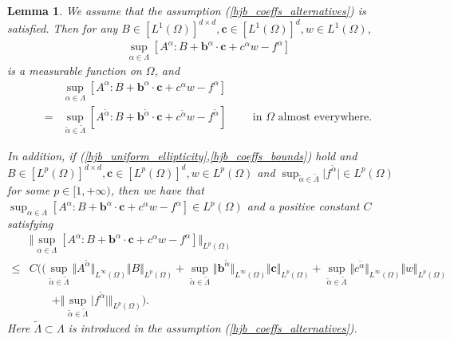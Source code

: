 \documentclass[12pt]{amsart}
\newtheorem{lemma}{Lemma}[section]
\theoremstyle{definition}
\theoremstyle{remark}
\begin{document}
\begin{lemma}
\label{lemma_hjb_measurable}
We assume that the assumption (\ref{hjb_coeffs_alternatives}) is satisfied. 
Then for any $B \in [L^{1}(\Omega)]^{d\times d}, \boldsymbol{c}\in 
[L^{1}(\Omega)]^{d}, w \in L^{1}(\Omega)$, 
\begin{align*}
\sup_{\alpha \in \Lambda} [A^{\alpha}:B 
+ \boldsymbol{b}^{\alpha}\cdot \boldsymbol{c} + c^{\alpha}w - f^{\alpha}]
\end{align*}
is a measurable function on $\Omega$, and 
\begin{align}
\label{hjb_uncountable_countable_equivalent}
& \sup_{\alpha \in \Lambda} [A^{\alpha}:B
+ \boldsymbol{b}^{\alpha}\cdot \boldsymbol{c} + c^{\alpha}w - f^{\alpha}] \\
\nonumber
= & \sup_{\tilde{\alpha} \in \tilde{\Lambda}} [A^{\tilde{\alpha}}:B 
+ \boldsymbol{b}^{\tilde{\alpha}}\cdot \boldsymbol{c} 
+ c^{\tilde{\alpha}}w - f^{\tilde{\alpha}}]
\qquad \text{ in } \Omega \text{ almost everywhere}.
\end{align}

In addition, if (\ref{hjb_uniform_ellipticity},\ref{hjb_coeffs_bounds}) 
hold and  $B\in [L^{p}(\Omega)]^{d\times d}, \boldsymbol{c}\in [L^{p}(\Omega)]^{d}, 
w \in L^{p}(\Omega)$ and $\sup_{\tilde{\alpha} 
\in \tilde{\Lambda}}\vert f^{\tilde{\alpha}}\vert \in L^{p}(\Omega)$ 
for some $p \in [1, +\infty)$, then we have that 
$\sup_{\alpha \in \Lambda} [A^{\alpha}:B
+ \boldsymbol{b}^{\alpha}\cdot \boldsymbol{c} 
+ c^{\alpha}w - f^{\alpha}] \in L^{p}(\Omega)$ and a positive constant $C$ satisfying
\begin{align}
\label{hjb_operator_bound1}
& \Vert \sup_{\alpha \in \Lambda} [A^{\alpha}:B 
+ \boldsymbol{b}^{\alpha}\cdot \boldsymbol{c} 
+ c^{\alpha}w - f^{\alpha}]\Vert_{L^{p}(\Omega)} \\
\nonumber
\leq & C \big( (\sup_{\tilde{\alpha}\in \tilde{\Lambda}}\Vert A^{\tilde{\alpha}}
\Vert_{L^{\infty}(\Omega)}\Vert B\Vert_{L^{p}(\Omega)}
 +\sup_{\tilde{\alpha}\in \tilde{\Lambda}}\Vert 
\boldsymbol{b}^{\tilde{\alpha}}\Vert_{L^{\infty}(\Omega)}
\Vert \boldsymbol{c}\Vert_{L^{p}(\Omega)} 
+ \sup_{\tilde{\alpha}\in \tilde{\Lambda}}\Vert c^{\tilde{\alpha}}
\Vert_{L^{\infty}(\Omega)}\Vert w\Vert_{L^{p}(\Omega)} \\
\nonumber
& \qquad + \Vert \sup_{\tilde{\alpha} 
\in \tilde{\Lambda}}\vert f^{\tilde{\alpha}}\vert \Vert_{L^{p}(\Omega)} \big).
\end{align}
Here $\tilde{\Lambda} \subset \Lambda$ is introduced in the assumption 
(\ref{hjb_coeffs_alternatives}).
\end{lemma}
\end{document}
